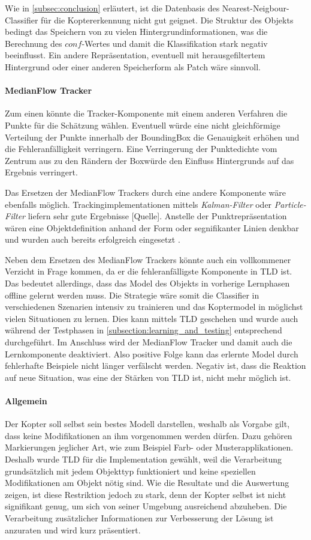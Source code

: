 	Wie in \ref{subsec:conclusion} erläutert, ist die Datenbasis des Nearest-Neigbour-Classifier für die Koptererkennung nicht gut geignet. Die Struktur des Objekts bedingt das Speichern von zu vielen Hintergrundinformationen, was die Berechnung des $conf$-Wertes und damit die Klassifikation stark negativ beeinflusst. Ein andere Repräsentation, eventuell mit herausgefiltertem Hintergrund oder einer anderen Speicherform als Patch wäre sinnvoll.

	\paragraph{MedianFlow Tracker}
		Zum einen könnte die Tracker-Komponente mit einem anderen Verfahren die Punkte für die Schätzung wählen. Eventuell würde eine nicht gleichförmige Verteilung der Punkte innerhalb der BoundingBox die Genauigkeit erhöhen und die Fehleranfälligkeit verringern. Eine Verringerung der Punktedichte vom Zentrum aus zu den Rändern der Boxwürde den Einfluss Hintergrunds auf das Ergebnis verringert.

		Das Ersetzen der MedianFlow Trackers durch eine andere Komponente wäre ebenfalls möglich. Trackingimplementationen mittels {\em Kalman-Filter} \cite{KAF} oder {\em Particle-Filter} \cite{PAF} liefern sehr gute Ergebnisse [Quelle]. Anstelle der Punktrepräsentation wären eine Objektdefinition anhand der Form oder segnifikanter Linien denkbar und wurden auch bereits erfolgreich eingesetzt \cite{AVT}. 

		Neben dem Ersetzen des MedianFlow Trackers könnte auch ein vollkommener Verzicht in Frage kommen, da er die fehleranfälligste Komponente in TLD ist. Das bedeutet allerdings, dass das Model des Objekts in vorherige Lernphasen offline gelernt werden muss. Die Strategie wäre somit die Classifier in verschiedenen Szenarien intensiv zu trainieren und das Koptermodel in möglichst vielen Situationen zu lernen. Dies kann mittels TLD geschehen und wurde auch während der Testphasen in \ref{subsection:learning_and_testing} entsprechend durchgeführt. Im Anschluss wird der MedianFlow Tracker und damit auch die Lernkomponente deaktiviert. Also positive Folge kann das erlernte Model durch fehlerhafte Beispiele nicht länger verfälscht werden. Negativ ist, dass die Reaktion auf neue Situation, was eine der Stärken von TLD ist, nicht mehr möglich ist.

	\paragraph{Allgemein}
		Der Kopter soll selbst sein bestes Modell darstellen, weshalb als Vorgabe gilt, dass keine Modifikationen an ihm vorgenommen werden dürfen. Dazu gehören Markierungen jeglicher Art, wie zum Beispiel Farb- oder Musterapplikationen. Deshalb wurde TLD für die Implementation gewählt, weil die Verarbeitung grundsätzlich mit jedem Objekttyp funktioniert und keine speziellen Modifikationen am Objekt nötig sind. Wie die Resultate und die Auswertung zeigen, ist diese Restriktion jedoch zu stark, denn der Kopter selbst ist nicht signifikant genug, um sich von seiner Umgebung ausreichend abzuheben. Die Verarbeitung zusätzlicher Informationen zur Verbesserung der Lösung ist anzuraten und wird kurz präsentiert.


